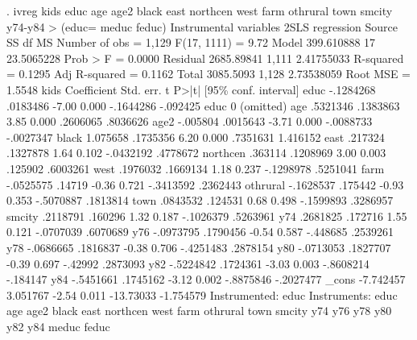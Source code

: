 . ivreg kids educ age age2 black east northcen west farm othrural town smcity y74-y84 
> (educ= meduc feduc)
{\smallskip}
Instrumental variables 2SLS regression
{\smallskip}
      Source {\VBAR}       SS           df       MS      Number of obs   =     1,129
   F(17, 1111)     =      9.72
       Model {\VBAR}  399.610888        17  23.5065228   Prob > F        =    0.0000
    Residual {\VBAR}  2685.89841     1,111  2.41755033   R-squared       =    0.1295
   Adj R-squared   =    0.1162
       Total {\VBAR}   3085.5093     1,128  2.73538059   Root MSE        =    1.5548
{\smallskip}
        kids {\VBAR} Coefficient  Std. err.      t    P>|t|     [95\% conf. interval]
        educ {\VBAR}  -.1284268   .0183486    -7.00   0.000    -.1644286    -.092425
        educ {\VBAR}          0  (omitted)
         age {\VBAR}   .5321346   .1383863     3.85   0.000     .2606065    .8036626
        age2 {\VBAR}   -.005804   .0015643    -3.71   0.000    -.0088733   -.0027347
       black {\VBAR}   1.075658   .1735356     6.20   0.000     .7351631    1.416152
        east {\VBAR}    .217324   .1327878     1.64   0.102    -.0432192    .4778672
    northcen {\VBAR}    .363114   .1208969     3.00   0.003      .125902    .6003261
        west {\VBAR}   .1976032   .1669134     1.18   0.237    -.1298978    .5251041
        farm {\VBAR}  -.0525575     .14719    -0.36   0.721    -.3413592    .2362443
    othrural {\VBAR}  -.1628537    .175442    -0.93   0.353    -.5070887    .1813814
        town {\VBAR}   .0843532    .124531     0.68   0.498    -.1599893    .3286957
      smcity {\VBAR}   .2118791    .160296     1.32   0.187    -.1026379    .5263961
         y74 {\VBAR}   .2681825    .172716     1.55   0.121    -.0707039    .6070689
         y76 {\VBAR}  -.0973795   .1790456    -0.54   0.587     -.448685    .2539261
         y78 {\VBAR}  -.0686665   .1816837    -0.38   0.706    -.4251483    .2878154
         y80 {\VBAR}  -.0713053   .1827707    -0.39   0.697      -.42992    .2873093
         y82 {\VBAR}  -.5224842   .1724361    -3.03   0.003    -.8608214    -.184147
         y84 {\VBAR}  -.5451661   .1745162    -3.12   0.002    -.8875846   -.2027477
       _cons {\VBAR}  -7.742457   3.051767    -2.54   0.011    -13.73033   -1.754579
Instrumented: educ
 Instruments: educ age age2 black east northcen west farm othrural town
              smcity y74 y76 y78 y80 y82 y84 meduc feduc
{\smallskip}
